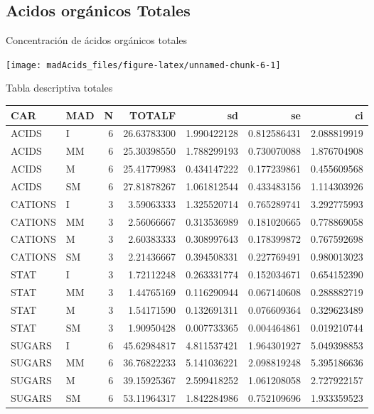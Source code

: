 \documentclass[
]{article}
\begin{document}
\subsection{Acidos orgánicos Totales}\label{acidos-orguxe1nicos-totales}

Concentración de ácidos orgánicos totales

\begin{center}\texttt{[image: madAcids\_files/figure-latex/unnamed-chunk-6-1]} \end{center}

Tabla descriptiva totales

\begin{longtable}[]{@{}llrrrrr@{}}
\toprule\noalign{}
CAR & MAD & N & TOTALF & sd & se & ci \\
\midrule\noalign{}
\endhead
\bottomrule\noalign{}
\endlastfoot
ACIDS & I & 6 & 26.63783300 & 1.990422128 & 0.812586431 & 2.088819919 \\
ACIDS & MM & 6 & 25.30398550 & 1.788299193 & 0.730070088 &
1.876704908 \\
ACIDS & M & 6 & 25.41779983 & 0.434147222 & 0.177239861 & 0.455609568 \\
ACIDS & SM & 6 & 27.81878267 & 1.061812544 & 0.433483156 &
1.114303926 \\
CATIONS & I & 3 & 3.59063333 & 1.325520714 & 0.765289741 &
3.292775993 \\
CATIONS & MM & 3 & 2.56066667 & 0.313536989 & 0.181020665 &
0.778869058 \\
CATIONS & M & 3 & 2.60383333 & 0.308997643 & 0.178399872 &
0.767592698 \\
CATIONS & SM & 3 & 2.21436667 & 0.394508331 & 0.227769491 &
0.980013023 \\
STAT & I & 3 & 1.72112248 & 0.263331774 & 0.152034671 & 0.654152390 \\
STAT & MM & 3 & 1.44765169 & 0.116290944 & 0.067140608 & 0.288882719 \\
STAT & M & 3 & 1.54171590 & 0.132691311 & 0.076609364 & 0.329623489 \\
STAT & SM & 3 & 1.90950428 & 0.007733365 & 0.004464861 & 0.019210744 \\
SUGARS & I & 6 & 45.62984817 & 4.811537421 & 1.964301927 &
5.049398853 \\
SUGARS & MM & 6 & 36.76822233 & 5.141036221 & 2.098819248 &
5.395186636 \\
SUGARS & M & 6 & 39.15925367 & 2.599418252 & 1.061208058 &
2.727922157 \\
SUGARS & SM & 6 & 53.11964317 & 1.842284986 & 0.752109696 &
1.933359523 \\
\end{longtable}
\end{document}
